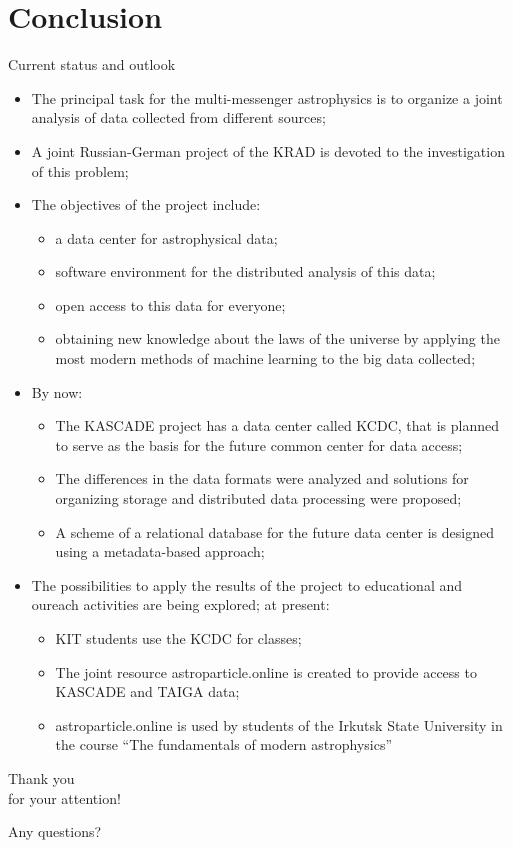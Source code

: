 \section{Conclusion}

\begin{frame}[allowframebreaks]{Current status and outlook}
\begin{itemize}
  \item The principal task for the multi-messenger astrophysics is to organize a joint analysis of data collected from different sources;
  \item A joint Russian-German project of the KRAD is devoted to the investigation of this problem;
  \item The objectives of the project include:
  \begin{itemize}
    \item a data center for astrophysical data;
    \item software environment for the distributed analysis of this data;
    \item open access to this data for everyone;
    \item obtaining new knowledge about the laws of the universe by applying the most modern methods of machine learning to the big data collected;
  \end{itemize}
  \framebreak
  \item By now:
  \begin{itemize}
    \item The KASCADE project has a data center called KCDC, that is planned to serve as the basis for the future common center for data access;
    \item The differences in the data formats were analyzed and solutions for organizing storage and distributed data processing were proposed;
    \item A scheme of a relational database for the future data center is designed using a metadata-based approach;
  \end{itemize}
  \item The possibilities to apply the results of the project to educational and oureach activities are being explored; at present:
  \begin{itemize}
    \item KIT students use the KCDC for classes;
    \item The joint resource astroparticle.online is created to provide access to KASCADE and TAIGA data;
    \item astroparticle.online is used by students of the Irkutsk State University in the course ``The fundamentals of modern astrophysics''
  \end{itemize}
\end{itemize}
\end{frame}

\begin{frame}{}
\Huge
    \begin{center}
        \textcolor{kit-green100}{Thank you\\for your attention!}

        \vspace{1em}
        \Large
        Any questions?
    \end{center}
\end{frame}
